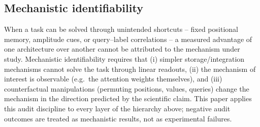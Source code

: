\subsection{Mechanistic identifiability}\label{sec:bkg-ident}

When a task can be solved through unintended shortcuts -- fixed
positional memory, amplitude cues, or query--label correlations -- a
measured advantage of one architecture over another cannot be attributed
to the mechanism under study.  Mechanistic identifiability requires that
(i) simpler storage/integration mechanisms cannot solve the task through
linear readouts, (ii) the mechanism of interest is observable (e.g.\ the
attention weights themselves), and (iii) counterfactual manipulations
(permuting positions, values, queries) change the mechanism in the
direction predicted by the scientific claim.  This paper applies this
audit discipline to every layer of the hierarchy above; negative audit
outcomes are treated as mechanistic results, not as experimental
failures.
